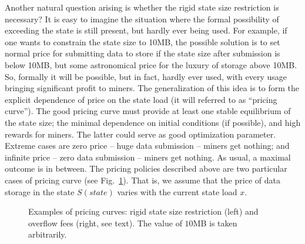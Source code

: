 \documentclass[]{llncs}   %
\begin{document}
Another natural question arising is whether the rigid state size restriction is
necessary?  It is easy to imagine the situation where the formal possibility of
exceeding the state is still present, but hardly ever being used. For example,
if one wants to constrain the state size to 10MB, the possible solution is to
set normal price for submitting data to store if the state size after submission
is below 10MB, but some astronomical price for the luxury of storage above 10MB.
So, formally it will be possible, but in fact, hardly ever used, with every
usage bringing significant profit to miners. The generalization of this idea is
to form the explicit dependence of price on the state load (it will referred to
as ``pricing curve''). The good pricing curve must provide at least one stable
equilibrium of the state size; the minimal dependence on initial conditions (if
possible), and high rewards for miners. The latter could serve as good
optimization parameter. Extreme cases are zero price -- huge data submission --
miners get nothing; and infinite price -- zero data submission -- miners get
nothing. As usual, a maximal outcome is in between.  The pricing policies
described above are two particular cases of pricing curve (see
Fig.~\ref{fig:steps}). That is, we assume that the price of data storage in the
state $S(state)$ varies with the current state load $x$. 
\begin{figure} 
    \hfill 
    \hfill 
    \hfill 
    \caption{ 
        Examples of pricing curves: rigid state size restriction (left) and 
        overflow fees (right, see text). The value of $10$MB is taken 
        arbitrarily. 
        \label{fig:steps} 
    } 
\end{figure} 
\end{document}
